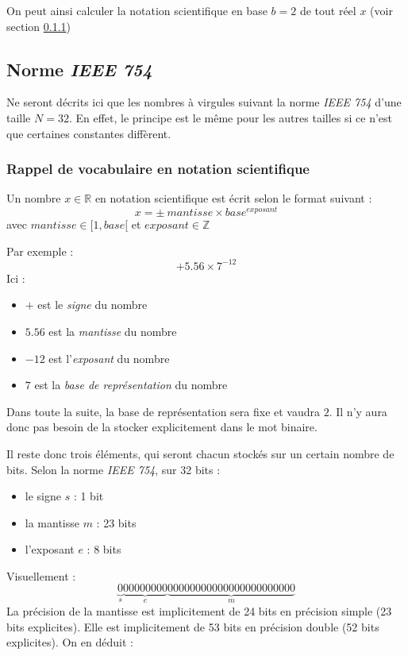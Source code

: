 \documentclass[../../main.tex]{subfiles}
\begin{document}
On peut ainsi calculer la notation scientifique en base $b = 2$ de tout réel $x$ (voir section \ref{ssub:rappel_de_vocabulaire_en_notation_scientifique})
\subsection{Norme \textit{IEEE 754}}
Ne seront décrits ici que les nombres à virgules suivant la norme \textit{IEEE 754} d'une taille $N = 32$. En effet, le principe est le même pour les autres tailles si ce n'est que certaines constantes diffèrent.

\subsubsection{Rappel de vocabulaire en notation scientifique} \label{ssub:rappel_de_vocabulaire_en_notation_scientifique}
Un nombre $x\in{\mathbb{R}}$ en notation scientifique est écrit selon le format suivant :
$$x = \pm\ mantisse \times{base^{exposant}}$$
avec $mantisse\in{[1, base[}$ et $exposant\in{\mathbb{Z}}$

Par exemple :
$$+ 5.56\times{7^{-12}}$$
Ici :
\begin{itemize}
     \item $+$ est le \textit{signe} du nombre
     \item $5.56$ est la \textit{mantisse} du nombre
     \item $-12$ est l'\textit{exposant} du nombre
     \item $7$ est la \textit{base de représentation} du nombre
\end{itemize}
Dans toute la suite, la base de représentation sera fixe et vaudra $2$. Il n'y aura donc pas besoin de la stocker explicitement dans le mot binaire.

Il reste donc trois éléments, qui seront chacun stockés sur un certain nombre de bits. \newline
Selon la norme \textit{IEEE 754}, sur 32 bits :
\begin{itemize}
     \item le signe $s$ : 1 bit
     \item la mantisse $m$ : 23 bits
     \item l'exposant $e$ : 8 bits
\end{itemize}
Visuellement :
$$\underbrace{0}_{s}\underbrace{00000000}_{e}\underbrace{00000000000000000000000}_{m}$$
La précision de la mantisse est implicitement de 24 bits en précision simple (23 bits explicites). Elle est implicitement de 53 bits en précision double (52 bits explicites). On en déduit :
\end{document}
